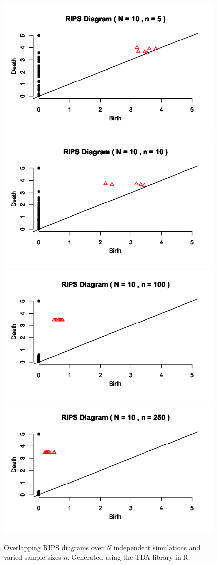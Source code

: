 \documentclass[12pt]{article}
\begin{document}
\begin{figure}[!htb]
  \includegraphics[width=0.8\linewidth]{RIPS_5n.png}
\endminipage\hfill
{}
  \includegraphics[width=0.8\linewidth]{RIPS_10n.png}
\endminipage\hfill
{}
  \includegraphics[width=0.8\linewidth]{RIPS_n100.png}
\endminipage\hfill
{}
  \includegraphics[width=0.8\linewidth]{RIPS_n250.png}
\endminipage\hfill
\caption{Overlapping RIPS diagrams over $N$ independent simulations and varied sample sizes $n$. Generated using the TDA library in R.}
\end{figure}
\end{document}
